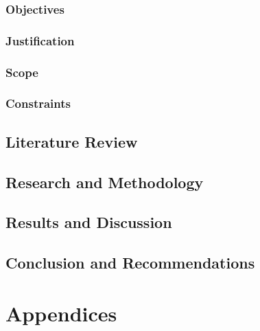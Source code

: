 \documentclass{report}
\begin{document}
\subsubsection{Objectives}



\subsubsection{Justification}

\subsubsection{Scope}

\subsubsection{Constraints}


\subsection{Literature Review}

\subsection{Research and Methodology}

\subsection{Results and Discussion}

\subsection{Conclusion and Recommendations}

%
\printbibliography

\section{Appendices}
\end{document}
